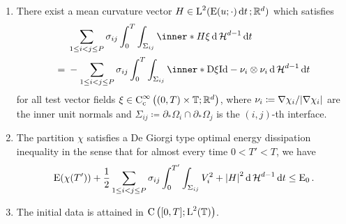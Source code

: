 \begin{definition}
\begin{enumerate}
		\item 
		There exist a mean curvature vector $ H \in 
		\operatorname{L}^{ 2 } ( \operatorname{E} ( u ; \cdot) \dd{ t } ; \mathbb{ R }^{ d } ) $ 
		which satisfies
		\begin{align}
			\notag
			& 
			\sum_{ 1 \leq i < j \leq P }
			\sigma_{ i j }
			\int_{ 0 }^{ T }
				\int_{ \Sigma_{ i j } }
				\inner*{ H }{ \xi }
				\dd{ \hm^{ d - 1 } }
			\dd{ t }
			\\
			\label{mean_curvature_vector_bv_de_giorgi}
			={} &
			-
			\sum_{ 1 \leq i < j \leq P }
			\sigma_{ i j }
			\int_{ 0 }^{ T }
				\int_{ \Sigma_{ i j } }
					\inner*{
						\diff \xi }
					{ \mathrm{Id} - \nu_{ i } \otimes \nu_{ i } }
				\dd{ \hm^{ d - 1 } }
			\dd{ t }
		\end{align}
		for all test vector fields 
		$ \xi \in \operatorname{C}_{ \mathrm{c} }^{ \infty } \left(
			( 0 , T ) \times \operatorname{\mathbb{T}} ; \mathbb{ R }^{ d }
		\right) $,
		where $ \nu_{ i } \coloneqq \nabla \chi_{ i } / \abs{ \nabla \chi_{ i } 
		} $ are the inner unit normals and $ \Sigma_{ i j } \coloneqq 
		\partial_{ \ast } \Omega_{ i } \cap \partial_{ \ast } \Omega_{ j } $
		is the $ (i, j )$-th interface.
		
		\item 
		The partition $ \chi $ satisfies a De Giorgi type optimal energy 
		dissipation inequality in the sense that for almost every time $ 0 < T' 
		< T $, we have
		\begin{equation}
			\label{optimal_energy_dissipation_solution}
			\operatorname{E} ( \chi ( T' ) )
			+
			\frac{ 1 }{ 2 }
			\sum_{ 1 \leq i < j \leq P }
				\sigma_{ i j }
				\int_{ 0 }^{ T' }
					\int_{ \Sigma_{ i j } }
						V_{ i }^{ 2 }
						+
						\abs{ H }^{ 2 }
					\dd{ \operatorname{\mathcal{H}}^{ d - 1 } }
				\dd{ t }
			\leq
			\operatorname{E}_{ 0 }.
		\end{equation}
		
		\item
		The initial data is attained in $ \operatorname{C} \left( [ 0 , T ] ; 
		\operatorname{L}^{ 2 } ( \operatorname{\mathbb{T}} ) \right) $.
	\end{enumerate}
\end{definition}


